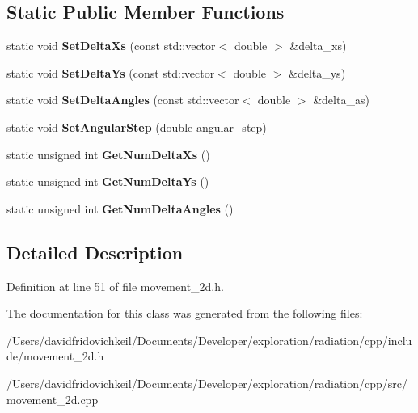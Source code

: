 \subsection*{Static Public Member Functions}
\begin{DoxyCompactItemize}
\item 
\hypertarget{classradiation_1_1_movement2_d_a1c790356eef522562200cfa5130b08be}{}\label{classradiation_1_1_movement2_d_a1c790356eef522562200cfa5130b08be} 
static void {\bfseries Set\+Delta\+Xs} (const std\+::vector$<$ double $>$ \&delta\+\_\+xs)
\item 
\hypertarget{classradiation_1_1_movement2_d_a33af86d467c9a25cc9aeec203971dd3d}{}\label{classradiation_1_1_movement2_d_a33af86d467c9a25cc9aeec203971dd3d} 
static void {\bfseries Set\+Delta\+Ys} (const std\+::vector$<$ double $>$ \&delta\+\_\+ys)
\item 
\hypertarget{classradiation_1_1_movement2_d_abd7a846520ba6960a7ca0978aca330df}{}\label{classradiation_1_1_movement2_d_abd7a846520ba6960a7ca0978aca330df} 
static void {\bfseries Set\+Delta\+Angles} (const std\+::vector$<$ double $>$ \&delta\+\_\+as)
\item 
\hypertarget{classradiation_1_1_movement2_d_a5126462f935176b6ef221b5097e94b7f}{}\label{classradiation_1_1_movement2_d_a5126462f935176b6ef221b5097e94b7f} 
static void {\bfseries Set\+Angular\+Step} (double angular\+\_\+step)
\item 
\hypertarget{classradiation_1_1_movement2_d_adc2e7c67bc134964455dbb77a76a117d}{}\label{classradiation_1_1_movement2_d_adc2e7c67bc134964455dbb77a76a117d} 
static unsigned int {\bfseries Get\+Num\+Delta\+Xs} ()
\item 
\hypertarget{classradiation_1_1_movement2_d_a399118d4ac735a1c1e93b8a4fdb17c63}{}\label{classradiation_1_1_movement2_d_a399118d4ac735a1c1e93b8a4fdb17c63} 
static unsigned int {\bfseries Get\+Num\+Delta\+Ys} ()
\item 
\hypertarget{classradiation_1_1_movement2_d_a021f8391f8c4b7479af22dba9416ab94}{}\label{classradiation_1_1_movement2_d_a021f8391f8c4b7479af22dba9416ab94} 
static unsigned int {\bfseries Get\+Num\+Delta\+Angles} ()
\end{DoxyCompactItemize}


\subsection{Detailed Description}


Definition at line 51 of file movement\+\_\+2d.\+h.



The documentation for this class was generated from the following files\+:\begin{DoxyCompactItemize}
\item 
/\+Users/davidfridovichkeil/\+Documents/\+Developer/exploration/radiation/cpp/include/movement\+\_\+2d.\+h\item 
/\+Users/davidfridovichkeil/\+Documents/\+Developer/exploration/radiation/cpp/src/movement\+\_\+2d.\+cpp\end{DoxyCompactItemize}
